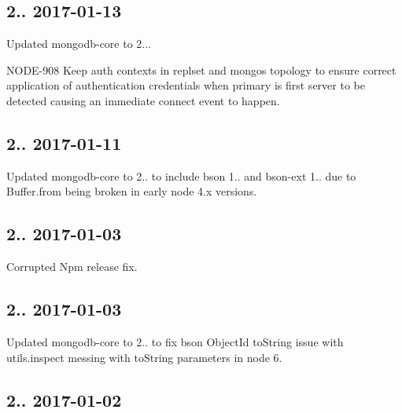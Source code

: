 \subsection*{2.. 2017-\/01-\/13 }


\begin{DoxyItemize}
\item Updated mongodb-\/core to 2...
\begin{DoxyItemize}
\item N\+O\+D\+E-\/908 Keep auth contexts in replset and mongos topology to ensure correct application of authentication credentials when primary is first server to be detected causing an immediate connect event to happen.
\end{DoxyItemize}
\end{DoxyItemize}

\subsection*{2.. 2017-\/01-\/11 }


\begin{DoxyItemize}
\item Updated mongodb-\/core to 2.. to include bson 1.. and bson-\/ext 1.. due to Buffer.\+from being broken in early node 4.\+x versions.
\end{DoxyItemize}

\subsection*{2.. 2017-\/01-\/03 }


\begin{DoxyItemize}
\item Corrupted Npm release fix.
\end{DoxyItemize}

\subsection*{2.. 2017-\/01-\/03 }


\begin{DoxyItemize}
\item Updated mongodb-\/core to 2.. to fix bson Object\+Id to\+String issue with utils.\+inspect messing with to\+String parameters in node 6.
\end{DoxyItemize}

\subsection*{2.. 2017-\/01-\/02 }


